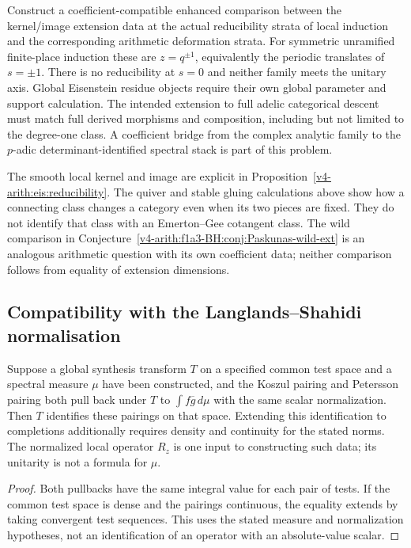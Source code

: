\begin{conjecture}
\label{v4-arith:w6-d:conj:exceptional-unitary-crossing}
Construct a coefficient-compatible enhanced comparison between the
kernel/image extension data at the actual reducibility strata of local
induction and the corresponding arithmetic deformation strata.
For symmetric unramified finite-place induction these are
$z=q^{\pm1}$, equivalently the periodic translates of $s=\pm1$.
There is no reducibility at $s=0$ and neither family meets the unitary
axis. Global Eisenstein residue objects require their own global
parameter and support calculation. The intended extension to full
adelic categorical descent must match full derived morphisms and
composition, including but not limited to the degree-one class.
A coefficient bridge from the complex analytic family to the
$p$-adic determinant-identified spectral stack is part of this problem.
\end{conjecture}
\begin{remark}
\label{v4-arith:w6-d:rem:exceptional-domain}
The smooth local kernel and image are explicit in
Proposition~\ref{v4-arith:eis:reducibility}. The quiver and stable
gluing calculations above show how a connecting class changes a
category even when its two pieces are fixed. They do not identify that
class with an Emerton--Gee cotangent class. The wild comparison in
Conjecture~\ref{v4-arith:f1a3-BH:conj:Paskunas-wild-ext} is an
analogous arithmetic question with its own coefficient data; neither
comparison follows from equality of extension dimensions.
\end{remark}

\subsection{Compatibility with the Langlands--Shahidi normalisation}

\begin{proposition}
\label{v4-arith:w6-d:prop:W6C-crossref}
Suppose a global synthesis transform $T$ on a specified common test
space and a spectral measure $\mu$ have been constructed, and the
Koszul pairing and Petersson pairing both pull back under $T$ to
$\int f\overline g\,d\mu$ with the same scalar normalization.
Then $T$ identifies these pairings on that space. Extending this
identification to completions additionally requires density and
continuity for the stated norms.
The normalized local operator $R_z$ is one input to constructing
such data; its unitarity is not a formula for $\mu$.
\end{proposition}
\begin{proof}
Both pullbacks have the same integral value for each pair of tests.
If the common test space is dense and the pairings continuous, the
equality extends by taking convergent test sequences. This uses the
stated measure and normalization hypotheses, not an identification
of an operator with an absolute-value scalar.
\end{proof}

